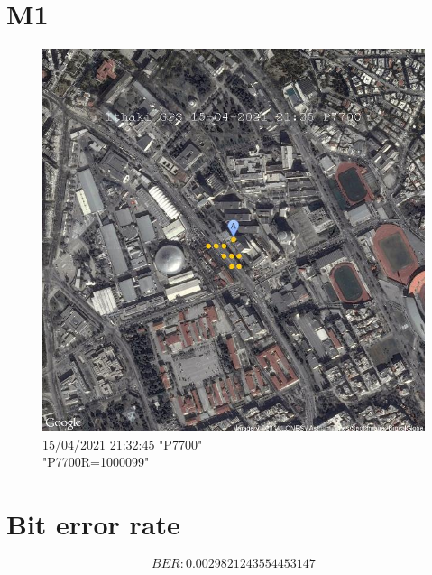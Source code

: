 \documentclass[hidelinks, 12pt, a4paper]{article}
\begin{document}
\pagebreak

\section{M1}

\begin{figure}[h!]
\centering
	\includegraphics[keepaspectratio, width=.8\textwidth]{gps.jpg}
    \caption{15/04/2021 21:32:45 "P7700" \\ "P7700R=1000099"} 
\end{figure}


\section{Bit error rate}

\[BER:0.0029821243554453147\]
\end{document}
